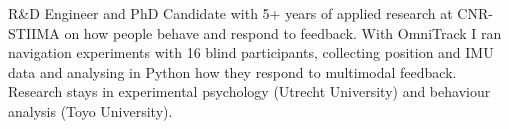 {R\&D Engineer and PhD Candidate with 5+ years of applied research at CNR-STIIMA on how people behave and respond to feedback. With OmniTrack I ran navigation experiments with 16 blind participants, collecting position and IMU data and analysing in Python how they respond to multimodal feedback. Research stays in experimental psychology (Utrecht University) and behaviour analysis (Toyo University).}

